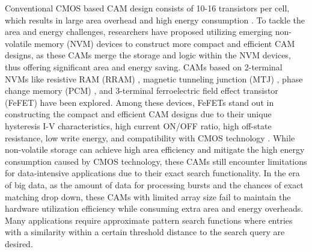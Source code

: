 Conventional  CMOS based CAM design consists of 10-16 transistors per cell, which results in large area overhead and high energy consumption \cite{16TCMOS}. 
To tackle the area and energy challenges,
researchers have proposed utilizing emerging non-volatile memory (NVM) devices to construct more compact and efficient CAM designs, as these  CAMs merge the storage and logic within the NVM devices, thus offering significant area and energy saving. 
CAMs based on 2-terminal NVMs like resistive RAM (RRAM) \cite{li2021sapiens,Chang3t1r}, magnetic tunneling junction (MTJ) \cite{Matsunaga4t2mtj, zhuo2022design}, phase change memory (PCM) \cite{jing2t2r}, and 3-terminal ferroelectric field effect transistor (FeFET) \cite{2FeFET,4T2FeFET,1FeFET1R-transfer, yin2022ferroelectric, yin2023ultracompact, xu2023challenges, Huang2024, yin2020fecam, li2020scalable} have been explored. 
Among these devices, FeFETs stand out in constructing the compact and efficient CAM designs due to their unique hysteresis I-V characteristics, high current ON/OFF ratio, high off-state resistance, low write energy, and compatibility with CMOS technology \cite{Liu2022eva-cam}.  
While non-volatile storage can achieve high area efficiency and  mitigate the high energy consumption caused by CMOS technology, these CAMs still encounter limitations for data-intensive applications  due to their exact search functionality.
In the era of big data, as the amount of data for processing bursts and the chances of exact matching drop down,  these CAMs with limited array size fail to maintain the hardware utilization efficiency while consuming extra area and energy overheads.
Many applications require approximate pattern search functions where entries with a similarity within a certain threshold distance to the search query are desired. 
